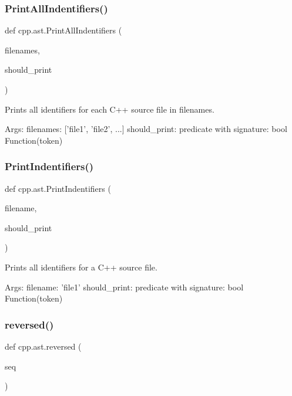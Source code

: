 \mbox{\label{namespacecpp_1_1ast_abc501124095357c1cf56eaf10e1df327}} 
\subsubsection{\texorpdfstring{PrintAllIndentifiers()}{PrintAllIndentifiers()}}
{\footnotesize\ttfamily def cpp.\+ast.\+Print\+All\+Indentifiers (\begin{DoxyParamCaption}\item[{}]{filenames,  }\item[{}]{should\+\_\+print }\end{DoxyParamCaption})}

\begin{DoxyVerb}Prints all identifiers for each C++ source file in filenames.

Args:
  filenames: ['file1', 'file2', ...]
  should_print: predicate with signature: bool Function(token)
\end{DoxyVerb}
 \mbox{\label{namespacecpp_1_1ast_a6a793b93aff7779af7017d001ce3b226}} 
\subsubsection{\texorpdfstring{PrintIndentifiers()}{PrintIndentifiers()}}
{\footnotesize\ttfamily def cpp.\+ast.\+Print\+Indentifiers (\begin{DoxyParamCaption}\item[{}]{filename,  }\item[{}]{should\+\_\+print }\end{DoxyParamCaption})}

\begin{DoxyVerb}Prints all identifiers for a C++ source file.

Args:
  filename: 'file1'
  should_print: predicate with signature: bool Function(token)
\end{DoxyVerb}
 \mbox{\label{namespacecpp_1_1ast_a0b1c00fd4aaa476b10de6b3a2550f39f}} 
\subsubsection{\texorpdfstring{reversed()}{reversed()}}
{\footnotesize\ttfamily def cpp.\+ast.\+reversed (\begin{DoxyParamCaption}\item[{}]{seq }\end{DoxyParamCaption})}



